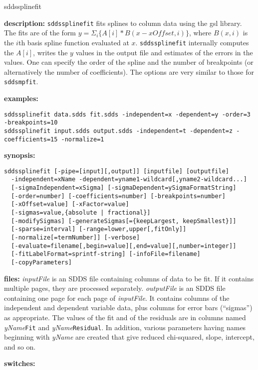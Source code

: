 \begin{sddsprog}{sddssplinefit}
  \item \textbf{description:} \verb|sddssplinefit| fits splines to column data using the gsl library. The fits are of the form $y = \Sigma_i \{ A[i] * B(x-xOffset, i)\}$, where $B(x,i)$ is the $i$th basis spline function evaluated at $x$. \verb|sddssplinefit| internally computes the $A[i]$, writes the $y$ values in the output file and estimates of the errors in the values. One can specify the order of the spline and the number of breakpoints (or alternatively the number of coefficients). The options are very similar to those for \verb|sddsmpfit|.
  \item \textbf{examples:}
    \begin{verbatim}
sddssplinefit data.sdds fit.sdds -independent=x -dependent=y -order=3 -breakpoints=10
sddssplinefit input.sdds output.sdds -independent=t -dependent=z -coefficients=15 -normalize=1
    \end{verbatim}
  \item \textbf{synopsis:}
    \begin{verbatim}
sddssplinefit [-pipe=[input][,output]] [inputfile] [outputfile]
  -independent=xName -dependent=yname1-wildcard[,yname2-wildcard...]
  [-sigmaIndependent=xSigma] [-sigmaDependent=ySigmaFormatString]
  [-order=number] [-coefficients=number] [-breakpoints=number]
  [-xOffset=value] [-xFactor=value]
  [-sigmas=value,{absolute | fractional}]
  [-modifySigmas] [-generateSigmas[={keepLargest, keepSmallest}]]
  [-sparse=interval] [-range=lower,upper[,fitOnly]]
  [-normalize[=termNumber]] [-verbose]
  [-evaluate=filename[,begin=value][,end=value][,number=integer]]
  [-fitLabelFormat=sprintf-string] [-infoFile=filename]
  [-copyParameters]
    \end{verbatim}
  \item \textbf{files:} \emph{inputFile} is an SDDS file containing columns of data to be fit. If it contains multiple pages, they are processed separately. \emph{outputFile} is an SDDS file containing one page for each page of \emph{inputFile}. It contains columns of the independent and dependent variable data, plus columns for error bars (``sigmas'') as appropriate. The values of the fit and of the residuals are in columns named \emph{yName}\verb|Fit| and \emph{yName}\verb|Residual|. In addition, various parameters having names beginning with \emph{yName} are created that give reduced chi-squared, slope, intercept, and so on.
  \item \textbf{switches:}

\end{sddsprog}
